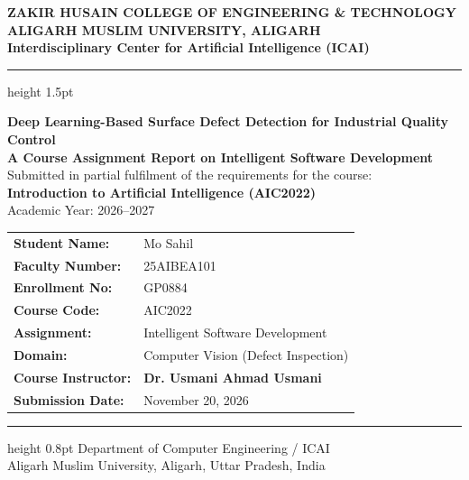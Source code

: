 \documentclass[12pt,a4paper]{report}
\begin{document}
\begin{titlepage}
    \centering
    \vspace*{0.5cm}
    
    {\Large \textbf{ZAKIR HUSAIN COLLEGE OF ENGINEERING \& TECHNOLOGY}}\\[0.25cm]
    {\large \textbf{ALIGARH MUSLIM UNIVERSITY, ALIGARH}}\\[0.2cm]
    {\normalsize \textbf{Interdisciplinary Center for Artificial Intelligence (ICAI)}}\\[0.6cm]
    
    \hrule height 1.5pt
    \vspace{0.8cm}
    
    {\LARGE \textbf{Deep Learning-Based Surface Defect Detection for Industrial Quality Control}}\\[0.6cm]
    
    {\large \textbf{A Course Assignment Report on Intelligent Software Development}}\\[0.4cm]
    {\normalsize Submitted in partial fulfilment of the requirements for the course:}\\[0.2cm]
    {\large \textbf{Introduction to Artificial Intelligence (AIC2022)}}\\[0.2cm]
    {\normalsize Academic Year: 2026--2027}\\[1.0cm]
    
    \begin{table}[h]
    \centering
    \large
    \begin{tabular}{ll}
        \textbf{Student Name:}    & Mo Sahil \\[0.25cm]
        \textbf{Faculty Number:}  & 25AIBEA101 \\[0.25cm]
        \textbf{Enrollment No:}   & GP0884 \\[0.25cm]
        \textbf{Course Code:}     & AIC2022 \\[0.25cm]
        \textbf{Assignment:}      & Intelligent Software Development \\[0.25cm]
        \textbf{Domain:}          & Computer Vision (Defect Inspection) \\[0.25cm]
        \textbf{Course Instructor:} & \textbf{Dr. Usmani Ahmad Usmani} \\[0.25cm]
        \textbf{Submission Date:} & November 20, 2026 \\
    \end{tabular}
    \end{table}
    
    \vfill
    \hrule height 0.8pt
    \vspace{0.4cm}
    {\normalsize Department of Computer Engineering / ICAI\\Aligarh Muslim University, Aligarh, Uttar Pradesh, India}
\end{titlepage}
\end{document}

